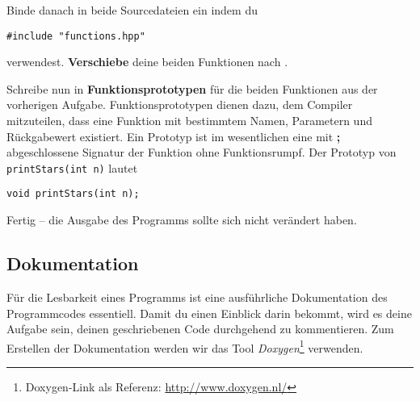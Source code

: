 Binde danach  in beide Sourcedateien ein indem du

\begin{lstlisting}
#include "functions.hpp"
\end{lstlisting}

verwendest.
\textbf{Verschiebe} deine beiden Funktionen nach .

Schreibe nun in  \textbf{Funktionsprototypen} für die beiden Funktionen aus der vorherigen Aufgabe.
Funktionsprototypen dienen dazu, dem Compiler mitzuteilen, dass eine Funktion mit bestimmtem Namen, Parametern und Rückgabewert existiert.
Ein Prototyp ist im wesentlichen eine mit \textbf{;} abgeschlossene Signatur der Funktion ohne Funktionsrumpf.
Der Prototyp von \lstinline{printStars(int n)} lautet 
\begin{lstlisting}
void printStars(int n);
\end{lstlisting}

Fertig -- die Ausgabe des Programms sollte sich nicht verändert haben.


\subsection{Dokumentation} \label{basics:doc}
Für die Lesbarkeit eines Programms ist eine ausführliche Dokumentation des Programmcodes essentiell.
Damit du einen Einblick darin bekommt, wird es deine Aufgabe sein, deinen geschriebenen Code durchgehend zu kommentieren. 
Zum Erstellen der Dokumentation werden wir das Tool \emph{Doxygen}\footnote{Doxygen-Link als Referenz: \url{http://www.doxygen.nl/}} verwenden.

